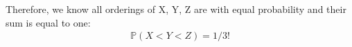 \begin{exercise}[BH.5.56]
\begin{solution}
\begin{enumerate}
    	Therefore, we know all orderings of X, Y, Z are with equal probability and their sum is equal to one:   
    	\begin{align*}
    		\mathbb{P}(X<Y<Z) =1/3!
    	\end{align*} 
	\end{enumerate}
\end{solution}
\end{exercise}


